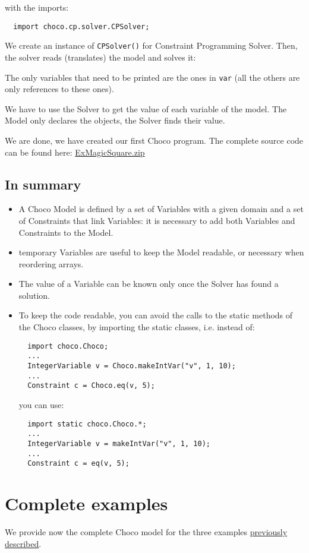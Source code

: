 with the imports:
\begin{lstlisting}
  import choco.cp.solver.CPSolver;
\end{lstlisting}
We create an instance of \texttt{CPSolver()} for Constraint Programming Solver.
Then, the solver reads (translates) the model and solves it:

The only variables that need to be printed are the ones in \texttt{var} (all the others are only references to these ones). 
\begin{note}
We have to use the Solver to get the value of each variable of the model. The Model only declares the objects, the Solver finds their value.
\end{note}
We are done, we have created our first Choco program. 
The complete source code can be found here: \href{media/zip/exmagicsquare.zip}{ExMagicSquare.zip}


\subsection{In summary}\label{introduction:whatisimportant}\hypertarget{introduction:whatisimportant}{}
\begin{itemize}
	\item A Choco Model is defined by a set of Variables with a given domain and a set of Constraints that link Variables:
it is necessary to add both Variables and Constraints to the Model.
	\item temporary Variables are useful to keep the Model readable, or necessary when reordering arrays.
	\item The value of a Variable can be known only once the Solver has found a solution.
	\item To keep the code readable, you can avoid the calls to the static methods of the Choco classes, by importing the static classes, i.e. instead of:
\begin{lstlisting}
  import choco.Choco;
  ...
  IntegerVariable v = Choco.makeIntVar("v", 1, 10);
  ...
  Constraint c = Choco.eq(v, 5);
\end{lstlisting}
you can use:
\begin{lstlisting}
  import static choco.Choco.*;
  ...
  IntegerVariable v = makeIntVar("v", 1, 10);
  ...
  Constraint c = eq(v, 5);
\end{lstlisting}
\end{itemize}

\section{Complete examples}\label{model:completeexamples}\hypertarget{model:completeexamples}{}
We provide now the complete Choco model for the three examples \hyperlink{introduction:examples}{previously described}.

